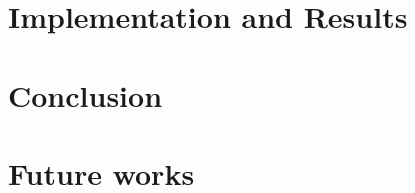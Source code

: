 \documentclass[a4paper, 11pt]{article}
\begin{document}

\section{Implementation and Results}









\section{Conclusion}

\section{Future works}


\printbibliography
\end{document}
